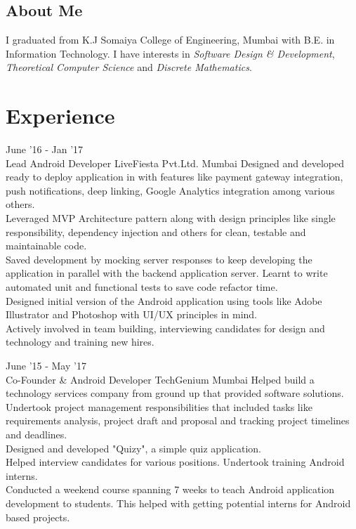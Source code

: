 \documentclass[10pt, a4paper, sans]{moderncv}
\title{}
\begin{document}
\makecvtitle

\subsection{\hfil About Me \hfil}
I graduated from K.J Somaiya College of Engineering, Mumbai with B.E. in Information Technology. I have interests in \emph{Software Design \& Development}, \emph{Theoretical Computer Science} and \emph{Discrete Mathematics}.

\section{Experience}
\cventry
{June '16 - Jan '17 \\ {\faAndroid} {\faUsers}}
{Lead Android Developer}
{LiveFiesta Pvt.Ltd.}
{Mumbai}
{}
{
{\faCaretRight} Designed and developed ready to deploy application in with features like payment gateway integration, push notifications, deep linking, Google Analytics integration among various others. \\
{\faCaretRight} Leveraged MVP Architecture pattern along with design principles like single responsibility, dependency injection and others for clean, testable and maintainable code. \\
{\faCaretRight} Saved development by mocking server responses to keep developing the application in parallel with the backend application server. Learnt to write automated unit and functional tests to save code refactor time. \\
{\faCaretRight} Designed initial version of the Android application using tools like Adobe Illustrator and Photoshop with UI/UX principles in mind. \\
{\faCaretRight} Actively involved in team building, interviewing candidates for design and technology and training new hires.
}

\cventry
{June '15 - May '17 \\ {\faAndroid} {\faBriefcase}}
{Co-Founder \& Android Developer}
{TechGenium}
{Mumbai}
{}
{
{\faCaretRight} Helped build a technology services company from ground up that provided software solutions. \\
{\faCaretRight} Undertook project management responsibilities that included tasks like requirements analysis, project draft and proposal and tracking project timelines and deadlines. \\
{\faCaretRight} Designed and developed "Quizy", a simple quiz application. \\
{\faCaretRight} Helped interview candidates for various positions. Undertook training Android interns. \\
{\faCaretRight} Conducted a weekend course spanning 7 weeks to teach Android application development to students. This helped with getting potential interns for Android based projects.
}
\end{document}
